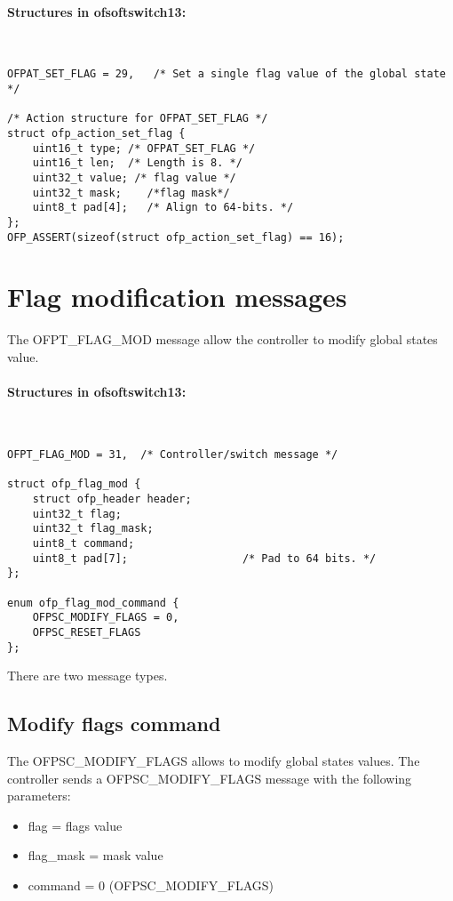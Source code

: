 \paragraph{Structures in ofsoftswitch13:}\mbox{}\\
\begin{verbatim}
OFPAT_SET_FLAG = 29,   /* Set a single flag value of the global state */

/* Action structure for OFPAT_SET_FLAG */
struct ofp_action_set_flag {
    uint16_t type; /* OFPAT_SET_FLAG */
    uint16_t len;  /* Length is 8. */
    uint32_t value; /* flag value */
    uint32_t mask;    /*flag mask*/
    uint8_t pad[4];   /* Align to 64-bits. */
};
OFP_ASSERT(sizeof(struct ofp_action_set_flag) == 16);
\end{verbatim}

\section{Flag modification messages}
\label{section:flag_mod_msg}
The OFPT\_FLAG\_MOD message allow the controller to modify global states value.
\paragraph{Structures in ofsoftswitch13:}\mbox{}\\
\begin{verbatim}
OFPT_FLAG_MOD = 31,  /* Controller/switch message */

struct ofp_flag_mod {
    struct ofp_header header;
    uint32_t flag;
    uint32_t flag_mask;
    uint8_t command;
    uint8_t pad[7];                  /* Pad to 64 bits. */
};

enum ofp_flag_mod_command { 
    OFPSC_MODIFY_FLAGS = 0,
    OFPSC_RESET_FLAGS
};

\end{verbatim}

There are two message types.
\subsection{Modify flags command}
The OFPSC\_MODIFY\_FLAGS allows to modify global states values. The controller sends a OFPSC\_MODIFY\_FLAGS message with the following parameters:
\begin{itemize}
\setlength\itemsep{0em}
\item flag = flags value
\item flag\_mask = mask value
\item command = 0 (OFPSC\_MODIFY\_FLAGS)
\end{itemize}

